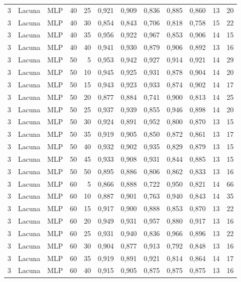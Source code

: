 \begin{longtable}{@{}rllrrrrrrrrr@{}}
3 & Lacuna & MLP & 40 & 25 & 0,921 & 0,909 & 0,836 & 0,885 & 0,860 & 13 & 20 \\
3 & Lacuna & MLP & 40 & 30 & 0,854 & 0,843 & 0,706 & 0,818 & 0,758 & 15 & 22 \\
3 & Lacuna & MLP & 40 & 35 & 0,956 & 0,922 & 0,967 & 0,853 & 0,906 & 14 & 15 \\
3 & Lacuna & MLP & 40 & 40 & 0,941 & 0,930 & 0,879 & 0,906 & 0,892 & 13 & 16 \\
3 & Lacuna & MLP & 50 & 5 & 0,953 & 0,942 & 0,927 & 0,914 & 0,921 & 14 & 29 \\
3 & Lacuna & MLP & 50 & 10 & 0,945 & 0,925 & 0,931 & 0,878 & 0,904 & 14 & 20 \\
3 & Lacuna & MLP & 50 & 15 & 0,943 & 0,923 & 0,933 & 0,874 & 0,902 & 14 & 17 \\
3 & Lacuna & MLP & 50 & 20 & 0,877 & 0,884 & 0,741 & 0,900 & 0,813 & 14 & 25 \\
3 & Lacuna & MLP & 50 & 25 & 0,937 & 0,939 & 0,855 & 0,946 & 0,898 & 14 & 20 \\
3 & Lacuna & MLP & 50 & 30 & 0,924 & 0,891 & 0,952 & 0,800 & 0,870 & 13 & 15 \\
3 & Lacuna & MLP & 50 & 35 & 0,919 & 0,905 & 0,850 & 0,872 & 0,861 & 13 & 17 \\
3 & Lacuna & MLP & 50 & 40 & 0,932 & 0,902 & 0,935 & 0,829 & 0,879 & 13 & 15 \\
3 & Lacuna & MLP & 50 & 45 & 0,933 & 0,908 & 0,931 & 0,844 & 0,885 & 13 & 15 \\
3 & Lacuna & MLP & 50 & 50 & 0,895 & 0,886 & 0,806 & 0,862 & 0,833 & 13 & 16 \\
3 & Lacuna & MLP & 60 & 5 & 0,866 & 0,888 & 0,722 & 0,950 & 0,821 & 14 & 66 \\
3 & Lacuna & MLP & 60 & 10 & 0,887 & 0,901 & 0,763 & 0,940 & 0,843 & 14 & 35 \\
3 & Lacuna & MLP & 60 & 15 & 0,917 & 0,900 & 0,888 & 0,853 & 0,870 & 13 & 22 \\
3 & Lacuna & MLP & 60 & 20 & 0,949 & 0,931 & 0,957 & 0,880 & 0,917 & 13 & 16 \\
3 & Lacuna & MLP & 60 & 25 & 0,931 & 0,940 & 0,836 & 0,966 & 0,896 & 13 & 22 \\
3 & Lacuna & MLP & 60 & 30 & 0,904 & 0,877 & 0,913 & 0,792 & 0,848 & 13 & 16 \\
3 & Lacuna & MLP & 60 & 35 & 0,919 & 0,891 & 0,921 & 0,814 & 0,864 & 14 & 17 \\
3 & Lacuna & MLP & 60 & 40 & 0,915 & 0,905 & 0,875 & 0,875 & 0,875 & 13 & 16 \\

\end{longtable}
